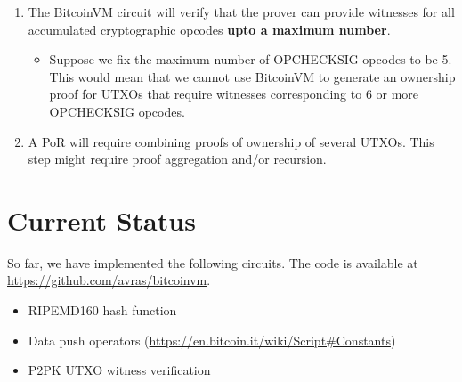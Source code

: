 \documentclass[10pt]{article}
\begin{document}
\begin{enumerate}
    \begin{itemize}
      \item Public keys for the OP\textunderscore CHECKSIG opcode
      \item Public keys for the OP\textunderscore CHECKMULTISIG opcode
      \item Hash outputs corresponding to the OP\textunderscore HASH160 opcode
    \end{itemize}
    To illustrate the accumulation, suppose a UTXO has the following scriptPubkey:
      \begin{align*}
        \texttt{ <key1> OP\_CHECKSIG OP\_SWAP <key2> OP\_CHECKSIG OP\_BOOLOR }
      \end{align*}
     A valid witness for this UTXO would be an ECDSA signature corresponding to one of the two keys. Only one of the keys needs to be accumulated in the accumulator corresponding to the OP\textunderscore CHECKSIG opcode.
  \item The BitcoinVM circuit will verify that the prover can provide witnesses for all accumulated cryptographic opcodes \textbf{upto a maximum number}.
    \begin{itemize}
      \item Suppose we fix the maximum number of OP\textunderscore CHECKSIG opcodes to be 5. This would mean that we cannot use BitcoinVM to generate an ownership proof for UTXOs that require witnesses corresponding to 6 or more OP\textunderscore CHECKSIG opcodes.
    \end{itemize}
  \item A PoR will require combining proofs of ownership of several UTXOs. This step might require proof aggregation and/or recursion.
\end{enumerate}

\section{Current Status}%
\label{sec:current_status}
So far, we have implemented the following circuits. The code is available at \url{https://github.com/avras/bitcoinvm}. 
\begin{itemize}
  \item RIPEMD160 hash function
  \item Data push operators (\url{https://en.bitcoin.it/wiki/Script#Constants}) 
  \item P2PK UTXO witness verification
\end{itemize}
\end{document}
